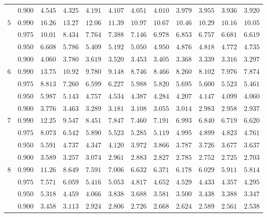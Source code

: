 \documentclass[11pt]{article}
\theoremstyle{definition}
\begin{document}
\begin{table}[H]
\begin{tabularx}{\linewidth}{c | c | c c c c c c c c c c}
		& $0.900$ & $4.545$ & $4.325$ & $4.191$ & $4.107$ & $4.051$ & $4.010$ & $3.979$ & $3.955$ & $3.936$ & $3.920$ \\
		$5$ & $0.990$ & $16.26$ & $13.27$ & $12.06$ & $11.39$ & $10.97$ & $10.67$ & $10.46$ & $10.29$ & $10.16$ & $10.05$ \\
		& $0.975$ & $10.01$ & $8.434$ & $7.764$ & $7.388$ & $7.146$ & $6.978$ & $6.853$ & $6.757$ & $6.681$ & $6.619$ \\
		& $0.950$ & $6.608$ & $5.786$ & $5.409$ & $5.192$ & $5.050$ & $4.950$ & $4.876$ & $4.818$ & $4.772$ & $4.735$ \\
		& $0.900$ & $4.060$ & $3.780$ & $3.619$ & $3.520$ & $3.453$ & $3.405$ & $3.368$ & $3.339$ & $3.316$ & $3.297$ \\
		$6$ & $0.990$ & $13.75$ & $10.92$ & $9.780$ & $9.148$ & $8.746$ & $8.466$ & $8.260$ & $8.102$ & $7.976$ & $7.874$ \\
		& $0.975$ & $8.813$ & $7.260$ & $6.599$ & $6.227$ & $5.988$ & $5.820$ & $5.695$ & $5.600$ & $5.523$ & $5.461$ \\
		& $0.950$ & $5.987$ & $5.143$ & $4.757$ & $4.534$ & $4.387$ & $4.284$ & $4.207$ & $4.147$ & $4.099$ & $4.060$ \\
		& $0.900$ & $3.776$ & $3.463$ & $3.289$ & $3.181$ & $3.108$ & $3.055$ & $3.014$ & $2.983$ & $2.958$ & $2.937$ \\
		$7$ & $0.990$ & $12.25$ & $9.547$ & $8.451$ & $7.847$ & $7.460$ & $7.191$ & $6.993$ & $6.840$ & $6.719$ & $6.620$ \\
		& $0.975$ & $8.073$ & $6.542$ & $5.890$ & $5.523$ & $5.285$ & $5.119$ & $4.995$ & $4.899$ & $4.823$ & $4.761$ \\
		& $0.950$ & $5.591$ & $4.737$ & $4.347$ & $4.120$ & $3.972$ & $3.866$ & $3.787$ & $3.726$ & $3.677$ & $3.637$ \\
		& $0.900$ & $3.589$ & $3.257$ & $3.074$ & $2.961$ & $2.883$ & $2.827$ & $2.785$ & $2.752$ & $2.725$ & $2.703$ \\
		$8$ & $0.990$ & $11.26$ & $8.649$ & $7.591$ & $7.006$ & $6.632$ & $6.371$ & $6.178$ & $6.029$ & $5.911$ & $5.814$ \\
		& $0.975$ & $7.571$ & $6.059$ & $5.416$ & $5.053$ & $4.817$ & $4.652$ & $4.529$ & $4.433$ & $4.357$ & $4.295$ \\
		& $0.950$ & $5.318$ & $4.459$ & $4.066$ & $3.838$ & $3.688$ & $3.581$ & $3.500$ & $3.438$ & $3.388$ & $3.347$ \\
		& $0.900$ & $3.458$ & $3.113$ & $2.924$ & $2.806$ & $2.726$ & $2.668$ & $2.624$ & $2.589$ & $2.561$ & $2.538$ \\

\end{tabularx}
\end{table}
\end{document}
